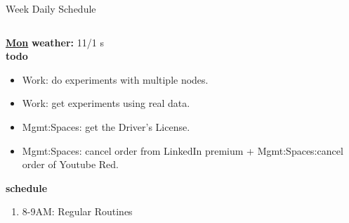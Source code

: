 \begin{columns}
\begin{column}{0.6\linewidth}
      \begin{block}{Week Daily Schedule}
        \begin{columns}
          \begin{column}{0.14\textwidth}{\small \underline{\bf Mon}}
            {\tiny \bf {\tiny weather:} } {\tiny 11/1 s} \\ 
            {\tiny \bf {\tiny todo}}\\ 
            \begin{itemize}
              \tiny \item \tiny Work: do experiments with multiple nodes. 
            \item \tiny Work: get experiments using real data. 
          \item \tiny Mgmt:Spaces: get the Driver's License.  
      \item \tiny Mgmt:Spaces: cancel order from LinkedIn premium +
        Mgmt:Spaces:cancel order of Youtube Red.  
            \end{itemize}
                {\small  \bf schedule}\\
                \begin{enumerate} 
                  \tiny \item \tiny 8-9AM: Regular Routines 
                \end{enumerate}
          \end{column}


\end{columns}
\end{block}
\end{column}
\end{columns}
